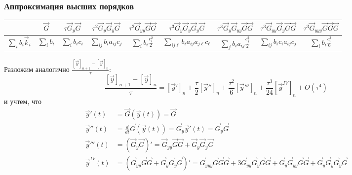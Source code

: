 \documentclass[professionalfonts,compress,unicode,aspectratio=169]{beamer}
\begin{document}
\begin{frame}\frametitle{Аппроксимация высших порядков}
	\begin{center}
	\footnotesize
	\begin{tabular}{c|c|c|c|c|c|c|c|c}
	&$\vec G$ &
	$\tau\vec G_y \vec G$ &
	$\tau^2\vec G_y \vec G_y \vec G$ & $\tau^2 \vec G_{yy} \vec G \vec G$ &
	$\tau^3 \vec G_y \vec G_y \vec G_y \vec G$ &
	$\tau^3 \vec G_y \vec G_{yy} \vec G \vec G$ &
	$\tau^3 \vec G_{yy} \vec G_y \vec G \vec G$ &
	$\tau^3 \vec G_{yyy} \vec G \vec G \vec G$\\\hline
	$\sum_i b_i \vec k_i$ &
	$\sum_i b_i$ &
	$\sum_i b_i c_i$ &
	$\sum_{ij} b_i a_{ij} c_j$ &
	$\sum_i b_i \frac{c_i^2}{2}$ &
	$\sum_{ij\ell} b_i a_{ij} a_{j\ell} c_\ell$ &
	$\sum_{j} b_i a_{ij} \frac{c_j^2}{2}$ &
	$\sum_{ij} b_i c_i a_{ij} c_j$ &
	$\sum_i b_i \frac{c_i^3}{6}$
	\end{tabular}
	\end{center}
	Разложим аналогично $\frac{[\vec y]_{n+1}-[\vec y]_n}{\tau}$:
	\[
	\frac{[\vec y]_{n+1}-[\vec y]_n}{\tau} = [\vec y']_n + \frac{\tau}{2} [\vec
y'']_n + \frac{\tau^2}{6} [\vec y''']_n + \frac{\tau^3}{24} [\vec y^{IV}]_n +
O(\tau^4)
	\]
	и учтем, что
	\begin{align*}
	\vec y'(t) &= \vec G(\vec y(t)) = \vec G\\
	\vec y''(t) &= \frac{d}{dt}\vec G(\vec y(t)) = \vec G_y \vec y'(t) = \vec G_y
\vec G\\
	\vec y'''(t) &= (\vec G_y \vec G)' = \vec G_{yy} \vec G \vec G + \vec G_y
\vec G_y \vec G\\
	\vec y^{IV}(t) &= (\vec G_{yy} \vec G \vec G + \vec G_y\vec G_y \vec G)' = 
	\vec G_{yyy} \vec G \vec G \vec G + 3 \vec G_{yy} \vec G_{y} \vec G \vec G
	+ \vec G_y \vec G_{yy} \vec G \vec G + \vec G_y \vec G_y \vec G_y \vec G
	\end{align*}
\end{frame}
\end{document}
